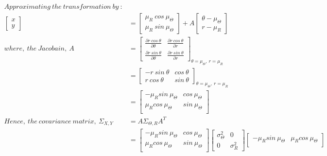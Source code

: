 \documentclass[a4paper,fleqn,11pt]{article}
\theoremstyle{mytheor}
\begin{document}
\begin{align*}
Approximating\ the\ transformation\ by\ : \\
\begin{bmatrix}
	x \\
	y
\end{bmatrix} & =
\begin{bmatrix}
	\mu_R\ cos\ \mu_{\Theta} \\
	\mu_R\ sin\ \mu_{\Theta}	
\end{bmatrix} + A 
\begin{bmatrix}
	\theta - \mu_{\Theta} \\
	r - \mu_R
\end{bmatrix} \\
where,\ the\ Jacobain,\ A & = \begin{bmatrix}
						\frac{\partial r\ cos\ \theta}{\partial \theta} & 									\frac{\partial r\ cos\ \theta}{\partial r} \\
						\frac{\partial r\ sin\ \theta}{\partial \theta} & 									\frac{\partial r\ sin\ \theta}{\partial r}
					  			\end{bmatrix}_{\theta = \mu_\Theta,\
					  								 r = \mu_R} \\
 				  & = \begin{bmatrix}
				 		-r\ sin\ \theta & cos\ \theta \\
				 		 r\ cos\ \theta & sin\ \theta
				 	  \end{bmatrix}_{\theta = \mu_\Theta,\ r = \mu_R} \\
				  & = \begin{bmatrix}
						-\mu_R sin\ \mu_\Theta & cos\ \mu_\Theta \\
						 \mu_R cos\ \mu_\Theta & sin\ \mu_\Theta \\
					  \end{bmatrix} \\
Hence,\ the\ covariance\ matrix,\ \Sigma_{X,Y} & = A \Sigma_{\Theta,R} A^T \\
& = \begin{bmatrix}
		-\mu_R sin\ \mu_\Theta & cos\ \mu_\Theta \\
		 \mu_R cos\ \mu_\Theta & sin\ \mu_\Theta \\
    \end{bmatrix}
    \begin{bmatrix}
	   \sigma_\Theta^2 & 0 \\
	   0			   & \sigma_R^2
    \end{bmatrix}
    \begin{bmatrix}
		-\mu_R sin\ \mu_\Theta & \mu_R cos\ \mu_\Theta \\

\end{bmatrix}
\end{align*}
\end{document}
